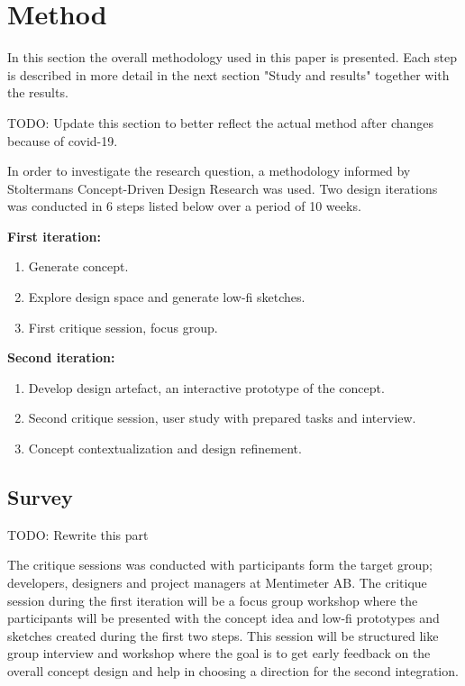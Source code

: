 

\section{Method}
In this section the overall methodology used in this paper is presented. Each step is described in more detail in the next section "Study and results" together with the results.

TODO: Update this section to better reflect the actual method after changes because of covid-19.

In order to investigate the research question, a methodology informed by Stoltermans Concept-Driven Design Research was used. \cite{stolterman_concept-driven_2010}
Two design iterations was conducted in 6 steps listed below over a period of 10 weeks.

\smallskip
\textbf{First iteration:}
\begin{enumerate}
  \item Generate concept.
  \item Explore design space and generate low-fi sketches.
  \item First critique session, focus group.
\end{enumerate}

\smallskip
\textbf{Second iteration:}
\begin{enumerate}
  \item Develop design artefact, an interactive prototype of the concept.
  \item Second critique session, user study with prepared tasks and interview.
  \item Concept contextualization and design refinement.
\end{enumerate}
\smallskip

\subsection{Survey}

TODO: Rewrite this part

The critique sessions was conducted with participants form the target group; developers, designers and project managers at Mentimeter AB. 
The critique session during the first iteration will be a focus group workshop where the participants will be presented with the concept idea and low-fi prototypes and sketches created during the first two steps. 
This session will be structured like group interview and workshop where the goal is to get early feedback on the overall concept design and help in choosing a direction for the second integration.

